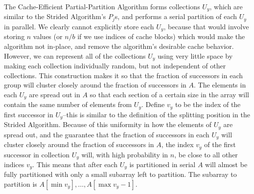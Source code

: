 \documentclass[sigconf]{acmart}
\theoremstyle{remark}
\theoremstyle{remark}
\begin{document}
The Cache-Efficient Partial-Partition Algorithm forms collections $U_y$, which are similar to the Strided Algorithm's $P_j$s, and performs a serial partition of each $U_y$ in parallel.
We clearly cannot explicitly store each $U_y$, because that would involve storing $n$ values (or $n/b$ if we use indices of cache blocks) which would make the algorithm not in-place, and remove the algorithm's desirable cache behavior. 
However, we can represent all of the collections $U_y$ using very little space by making each collection individually random, but not independent of other collections. 
This construction makes it so that the fraction of successors in each group will cluster closely around the fraction of successors in $A$.
The elements in each $U_y$ are spread out in $A$ so that each section of a certain size in the array will contain the same number of elements from $U_y$. 
Define $v_y$ to be the index of the first successor in $U_y$--this is similar to the definition of the splitting position in the Strided Algorithm.
Because of this uniformity in how the elements of $U_y$ are spread out, and the guarantee that the fraction of successors in each $U_y$ will cluster closely around the fraction of successors in $A$, the index $v_y$ of the first successor in collection $U_y$ will, with high probability in $n$, be close to all other indices $v_y$.
This means that after each $U_y$ is partitioned in serial $A$ will almost be fully partitioned with only a small subarray left to partition.
The subarray to partition is $A[\min{v_y}], \ldots, A[\max{v_y}-1]$.
\end{document}
